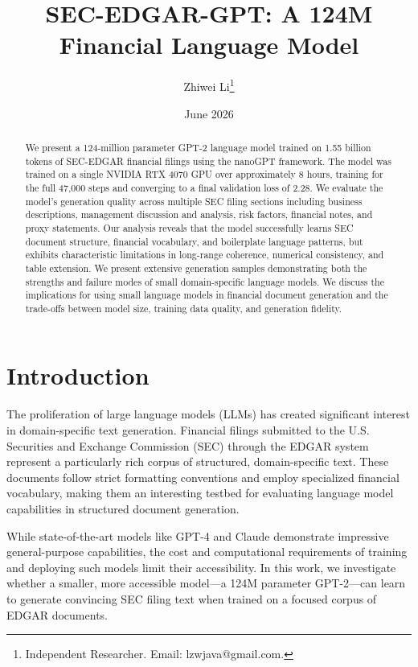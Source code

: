 \documentclass[12pt]{article}
\title{SEC-EDGAR-GPT: A 124M Financial Language Model}
\author{
  Zhiwei Li\thanks{Independent Researcher. Email: lzwjava@gmail.com.}
}
\date{June 2026}
\begin{document}
\maketitle

\begin{abstract}
We present a 124-million parameter GPT-2 language model trained on 1.55 billion tokens of SEC-EDGAR financial filings using the nanoGPT framework. The model was trained on a single NVIDIA RTX 4070 GPU over approximately 8 hours, training for the full 47,000 steps and converging to a final validation loss of 2.28. We evaluate the model's generation quality across multiple SEC filing sections including business descriptions, management discussion and analysis, risk factors, financial notes, and proxy statements. Our analysis reveals that the model successfully learns SEC document structure, financial vocabulary, and boilerplate language patterns, but exhibits characteristic limitations in long-range coherence, numerical consistency, and table extension. We present extensive generation samples demonstrating both the strengths and failure modes of small domain-specific language models. We discuss the implications for using small language models in financial document generation and the trade-offs between model size, training data quality, and generation fidelity.
\end{abstract}

\section{Introduction}

The proliferation of large language models (LLMs) has created significant interest in domain-specific text generation. Financial filings submitted to the U.S. Securities and Exchange Commission (SEC) through the EDGAR system represent a particularly rich corpus of structured, domain-specific text. These documents follow strict formatting conventions and employ specialized financial vocabulary, making them an interesting testbed for evaluating language model capabilities in structured document generation.

While state-of-the-art models like GPT-4 and Claude demonstrate impressive general-purpose capabilities, the cost and computational requirements of training and deploying such models limit their accessibility. In this work, we investigate whether a smaller, more accessible model---a 124M parameter GPT-2---can learn to generate convincing SEC filing text when trained on a focused corpus of EDGAR documents.
\end{document}
